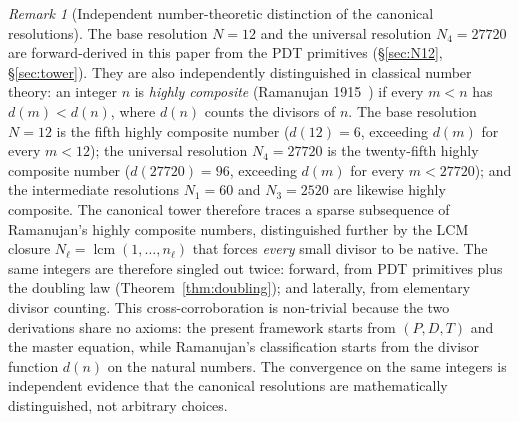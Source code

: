 \documentclass[11pt,a4paper]{article}
\theoremstyle{definition}
\theoremstyle{remark}
\newtheorem{remark}[theorem]{Remark}
\DeclareMathOperator{\lcm}{lcm}
\begin{document}
\begin{remark}[Independent number-theoretic distinction of the canonical resolutions]\label{rem:hcn-anchor}
The base resolution $N=12$ and the universal resolution $N_{4}=27720$ are forward-derived in this paper from the PDT primitives (\S\ref{sec:N12}, \S\ref{sec:tower}). They are also independently distinguished in classical number theory: an integer $n$ is \emph{highly composite} (Ramanujan 1915~\cite{Ramanujan1915}) if every $m < n$ has $d(m) < d(n)$, where $d(n)$ counts the divisors of $n$. The base resolution $N=12$ is the fifth highly composite number ($d(12)=6$, exceeding $d(m)$ for every $m<12$); the universal resolution $N_{4}=27720$ is the twenty-fifth highly composite number ($d(27720)=96$, exceeding $d(m)$ for every $m<27720$); and the intermediate resolutions $N_{1}=60$ and $N_{3}=2520$ are likewise highly composite. The canonical tower therefore traces a sparse subsequence of Ramanujan's highly composite numbers, distinguished further by the LCM closure $N_{\ell} = \lcm(1,\ldots,n_{\ell})$ that forces \emph{every} small divisor to be native. The same integers are therefore singled out twice: forward, from PDT primitives plus the doubling law (Theorem~\ref{thm:doubling}); and laterally, from elementary divisor counting. This cross-corroboration is non-trivial because the two derivations share no axioms: the present framework starts from $(P,D,T)$ and the master equation, while Ramanujan's classification starts from the divisor function $d(n)$ on the natural numbers. The convergence on the same integers is independent evidence that the canonical resolutions are mathematically distinguished, not arbitrary choices.
\end{remark}
\end{document}
